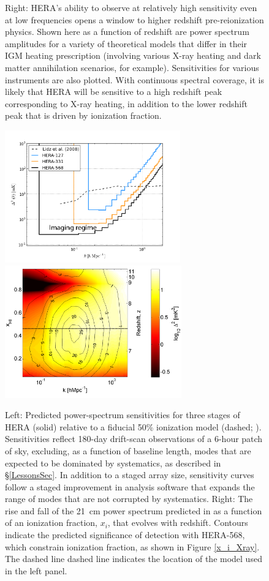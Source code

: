 \documentclass[preprint]{aastex}
\begin{document}
\begin{figure}[!ht]
{Right: HERA's ability to
observe at relatively high sensitivity even at low frequencies opens a window to
higher redshift pre-reionization physics.  Shown here as a function of redshift are power spectrum amplitudes
for a variety of theoretical models that differ in their IGM heating prescription (involving various X-ray heating
and dark matter annihilation scenarios, for example).  Sensitivities for various instruments are also plotted.
With continuous spectral coverage, it is likely that HERA will be sensitive to a high redshift peak corresponding
to X-ray heating, in addition to the lower redshift peak that is driven by ionization fraction.
}\label{fig:x_i_Xray}
\end{figure}

\begin{figure}[!ht]\centering
\includegraphics[height=2.25in]{plots/eor_pspec.png}
~ %
\includegraphics[height=2.25in]{plots/hera_snr_contour.png}
\caption{\small
Left: Predicted power-spectrum sensitivities for three stages of
HERA (solid) relative to a fiducial 50\% ionization model 
(dashed; \citealt{lidz_et_al2008}).  Sensitivities reflect
180-day drift-scan observations of a 6-hour patch of sky, excluding,
as a function of baseline length, modes that are expected to be
dominated by systematics, as described in \S\ref{LessonsSec}.  In addition
to a staged array size, sensitivity curves follow
a staged improvement in analysis software that expands the range
of modes that are not corrupted by systematics.  
Right: 
The rise and fall of the 21~cm power spectrum predicted in
\citet{lidz_et_al2008} as a function of an ionization fraction, $x_i$,
that evolves with redshift.  Contours indicate the predicted significance
of detection with HERA-568, which constrain ionization fraction, as shown in
Figure \ref{x_i_Xray}.  The dashed line dashed line indicates the location
of the model used in the left panel.
}\label{fig:eor_pspec}
\end{figure}
\end{document}
